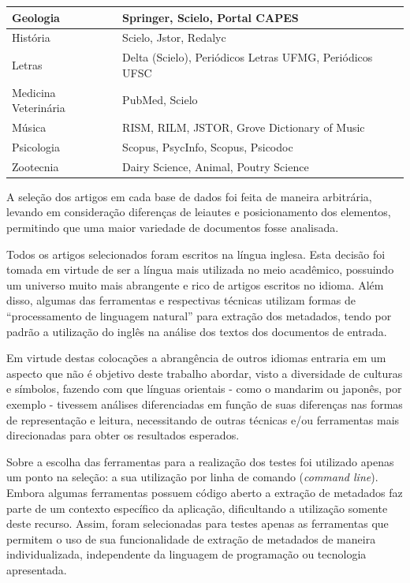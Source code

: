\begin{table}
\begin{center}
\begin{tabular}{|p{6cm}|p{8cm}|}
            Geologia & Springer, Scielo, Portal CAPES \\
            \hline
            História & Scielo, Jstor, Redalyc \\
            \hline
            Letras & Delta (Scielo), Periódicos Letras UFMG, Periódicos UFSC \\
            \hline
            Medicina Veterinária & PubMed, Scielo \\
            \hline
            Música & RISM, RILM, JSTOR, Grove Dictionary of Music \\
            \hline
            Psicologia & Scopus, PsycInfo, Scopus, Psicodoc \\
            \hline
            Zootecnia & Dairy Science, Animal, Poutry Science \\
            \hline
        \end{tabular}
    \end{center}
    \label{tab:databases}
\end{table}

A seleção dos artigos em cada base de dados foi feita de maneira arbitrária, levando em consideração diferenças de leiautes e posicionamento dos elementos, permitindo que uma maior variedade de documentos fosse analisada.


Todos os artigos selecionados foram escritos na língua inglesa. Esta decisão foi tomada em virtude de ser a língua mais utilizada no meio acadêmico, possuindo um universo muito mais abrangente e rico de artigos escritos no idioma. Além disso, algumas das ferramentas e respectivas técnicas utilizam formas de ``processamento de linguagem natural'' para extração dos metadados, tendo por padrão a utilização do inglês na análise dos textos dos documentos de entrada.

Em virtude destas colocações a abrangência de outros idiomas entraria em um aspecto que não é objetivo deste trabalho abordar, visto a diversidade de culturas e símbolos, fazendo com que línguas orientais - como o mandarim ou japonês, por exemplo - tivessem análises diferenciadas em função de suas diferenças nas formas de representação e leitura, necessitando de outras técnicas e/ou ferramentas mais direcionadas para obter os resultados esperados.

Sobre a escolha das ferramentas para a realização dos testes foi utilizado apenas um ponto na seleção: a sua utilização por linha de comando (\emph{command line}). Embora algumas ferramentas possuem código aberto a extração de metadados faz parte de um contexto específico da aplicação, dificultando a utilização somente deste recurso. Assim, foram selecionadas para testes apenas as ferramentas que permitem o uso de sua funcionalidade de extração de metadados de maneira individualizada, independente da linguagem de programação ou tecnologia apresentada. 

